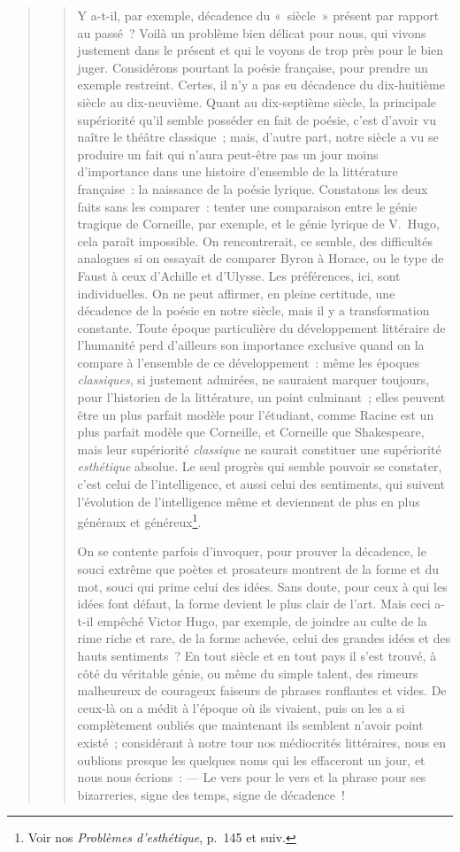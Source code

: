 \documentclass[french,twoside]{book} %
\begin{document}
\begin{verse}
\begin{verse}
Y a-t-il, par exemple, décadence du « siècle » présent par rapport au passé ? Voilà un problème bien délicat pour nous, qui vivons justement dans le présent et qui le voyons de trop près pour le bien juger. Considérons pourtant la poésie française, pour prendre un exemple restreint. Certes, il n’y a pas eu décadence du dix-huitième siècle au dix-neuvième. Quant au dix-septième siècle, la principale supériorité qu’il semble posséder en fait de poésie, c’est d’avoir vu naître le théâtre classique ; mais, d’autre part, notre siècle a vu se produire un fait qui n’aura peut-être pas un jour moins d’importance dans une histoire d’ensemble de la littérature française : la naissance de la poésie lyrique. Constatons les deux faits sans les comparer : tenter une comparaison entre le génie tragique de Corneille, par exemple, et le génie lyrique de V. Hugo, cela paraît impossible. On rencontrerait, ce semble, des difficultés analogues si on essayait de comparer Byron à Horace, ou le type de Faust à ceux d’Achille et d’Ulysse. Les préférences, ici, sont individuelles. On ne peut affirmer, en pleine certitude, une décadence de la poésie en notre siècle, mais il y a transformation constante. Toute époque particulière du développement littéraire de l’humanité perd d’ailleurs son importance exclusive quand on la compare à l’ensemble de ce développement : même les époques \emph{classiques}, si justement admirées, ne sauraient marquer toujours, pour l’historien de la littérature, un point culminant ; elles peuvent être un plus parfait modèle pour l’étudiant, comme Racine est un plus parfait modèle que Corneille, et Corneille que Shakespeare, mais leur supériorité \emph{classique} ne saurait constituer une supériorité \emph{esthétique} absolue. Le seul progrès qui semble pouvoir se constater, c’est celui de l’intelligence, et aussi celui des sentiments, qui suivent l’évolution de l’intelligence même et deviennent de plus en plus généraux et généreux\footnote{ Voir nos \emph{Problèmes d’esthétique}, p. 145 et suiv.}.\par
On se contente parfois d’invoquer, pour prouver la décadence, le souci extrême que poètes et prosateurs montrent de la forme et du mot, souci qui prime celui des idées. Sans doute, pour ceux à qui les idées font défaut, la forme devient le plus clair de l’art. Mais ceci a-t-il empêché Victor Hugo, par exemple, de joindre au culte de la rime riche et rare, de la forme achevée, celui des grandes idées et des hauts sentiments ? En tout siècle et en tout pays il s’est trouvé, à côté du véritable génie, ou même du simple talent, des rimeurs malheureux de courageux faiseurs de phrases ronflantes et vides. De ceux-là on a médit à l’époque où ils vivaient, puis on les a si complètement oubliés que maintenant ils semblent n’avoir point existé ; considérant à notre tour nos médiocrités littéraires, nous en oublions presque les quelques noms qui les effaceront un jour, et nous nous écrions : — Le vers pour le vers et la phrase pour ses bizarreries, signe des temps, signe de décadence !\par

\end{verse}
\end{verse}
\end{document}
